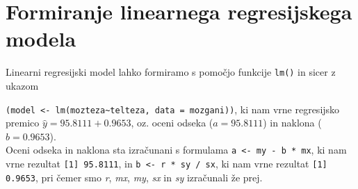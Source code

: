 \section{Formiranje linearnega regresijskega modela}

Linearni regresijski model lahko formiramo s pomočjo funkcije \verb|lm()| in sicer z ukazom

\noindent
\verb|(model <- lm(mozteza~telteza, data = mozgani))|, ki nam vrne regresijsko premico
$\widehat{y} = 95.8111 + 0.9653$, oz. oceni odseka ($\widehat{a} = 95.8111$) in naklona ($\widehat{b} = 0.9653$).\\

\noindent
Oceni odseka in naklona sta izračunani s formulama \verb|a <- my - b * mx|, ki nam vrne rezultat \verb|[1] 95.8111|,
in \verb|b <- r * sy / sx|, ki nam vrne rezultat \verb|[1] 0.9653|, pri čemer smo \emph{r}, \emph{mx}, \emph{my},
\emph{sx} in \emph{sy} izračunali že prej.